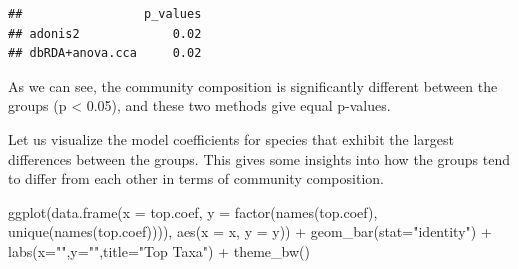 \documentclass[
]{book}
\newenvironment{Shaded}{\begin{snugshade}}{\end{snugshade}}
\newcommand{\AttributeTok}[1]{\textcolor[rgb]{0.77,0.63,0.00}{#1}}
\newcommand{\CommentTok}[1]{\textcolor[rgb]{0.56,0.35,0.01}{\textit{#1}}}
\newcommand{\ConstantTok}[1]{\textcolor[rgb]{0.00,0.00,0.00}{#1}}
\newcommand{\DecValTok}[1]{\textcolor[rgb]{0.00,0.00,0.81}{#1}}
\newcommand{\FunctionTok}[1]{\textcolor[rgb]{0.00,0.00,0.00}{#1}}
\newcommand{\NormalTok}[1]{#1}
\newcommand{\OtherTok}[1]{\textcolor[rgb]{0.56,0.35,0.01}{#1}}
\newcommand{\SpecialCharTok}[1]{\textcolor[rgb]{0.00,0.00,0.00}{#1}}
\newcommand{\StringTok}[1]{\textcolor[rgb]{0.31,0.60,0.02}{#1}}
\begin{document}
\begin{verbatim}
##                 p_values
## adonis2             0.02
## dbRDA+anova.cca     0.02
\end{verbatim}

As we can see, the community composition is significantly different
between the groups (p \textless{} 0.05), and these two methods give equal p-values.

Let us visualize the model coefficients for species that exhibit the
largest differences between the groups. This gives some insights into
how the groups tend to differ from each other in terms of community
composition.

\begin{Shaded}
\end{Shaded}

\begin{Shaded}
\begin{Highlighting}[]
\FunctionTok{ggplot}\NormalTok{(}\FunctionTok{data.frame}\NormalTok{(}\AttributeTok{x =}\NormalTok{ top.coef,}
                  \AttributeTok{y =} \FunctionTok{factor}\NormalTok{(}\FunctionTok{names}\NormalTok{(top.coef),}
                                      \FunctionTok{unique}\NormalTok{(}\FunctionTok{names}\NormalTok{(top.coef)))),}
        \FunctionTok{aes}\NormalTok{(}\AttributeTok{x =}\NormalTok{ x, }\AttributeTok{y =}\NormalTok{ y)) }\SpecialCharTok{+}
    \FunctionTok{geom\_bar}\NormalTok{(}\AttributeTok{stat=}\StringTok{"identity"}\NormalTok{) }\SpecialCharTok{+}
    \FunctionTok{labs}\NormalTok{(}\AttributeTok{x=}\StringTok{""}\NormalTok{,}\AttributeTok{y=}\StringTok{""}\NormalTok{,}\AttributeTok{title=}\StringTok{"Top Taxa"}\NormalTok{) }\SpecialCharTok{+}
    \FunctionTok{theme\_bw}\NormalTok{()}
\end{Highlighting}
\end{Shaded}
\end{document}
